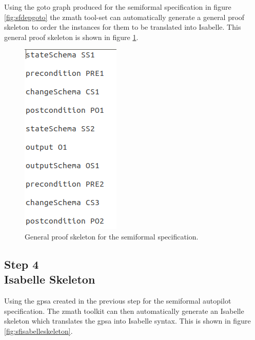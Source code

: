  Using the goto graph produced for the semiformal specification in figure
 \ref{fig:sfdepgoto} the \gls{zmath} tool-set can automatically generate a
 general proof skeleton to order the instances for them to be translated into
 Isabelle. This general proof skeleton is shown in figure \ref{fig:sfgpsa}.

 \begin{figure}[H]
 \centering
 \includegraphics[scale=0.5]{Figures/fullexample/sfgpsa.png}
 \caption{General proof skeleton for the semiformal specification. \label{fig:sfgpsa}}
 \end{figure}

 \subsection{Step 4\\Isabelle Skeleton}

 Using the \gls{gpsa} created in the previous step for the semiformal autopilot
 specification. The \gls{zmath} toolkit can then automatically generate an
 Isabelle skeleton which translates the \gls{gpsa} into Isabelle syntax. This is
 shown in figure \ref{fig:sfisabelleskeleton}.

